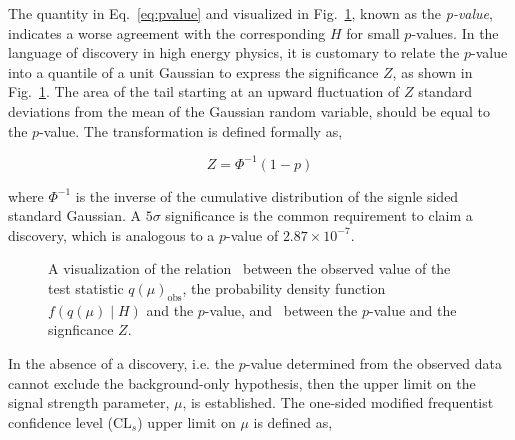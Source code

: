 The quantity in Eq.~\ref{eq:pvalue} and visualized in Fig.~\ref{fig:pvalues}, known as the \textit{p-value}, indicates a worse agreement with the corresponding $H$ for small $p$-values. In the language of discovery in high energy physics, it is customary to relate the $p$-value into a quantile of a unit Gaussian to express the significance $Z$, as shown in Fig.~\ref{fig:pvalues}. The area of the tail starting at an upward fluctuation of $Z$ standard deviations from the mean of the Gaussian random variable, should be equal to the $p$-value. The transformation is defined formally as, 

\begin{equation}
  Z = \Phi^{-1}(1-p)
\end{equation}

where $\Phi^{-1}$ is the inverse of the cumulative distribution of the signle sided standard Gaussian. A $5\sigma$ significance is the common requirement to claim a discovery, which is analogous to a $p$-value of $2.87 \times 10^{-7}$.

\begin{figure}[htbp!]
  \caption{A visualization of the relation~\protect{} between the observed value of the test statistic $q(\mu)_{\textrm{obs}}$, the probability density function $f(q(\mu)\mid H)$ and the $p$-value, and~\protect{} between the $p$-value and the signficance $Z$.}
  \label{fig:pvalues}
\end{figure}

In the absence of a discovery, i.e. the $p$-value determined from the observed data cannot exclude the background-only hypothesis, then the upper limit on the signal strength parameter, $\mu$, is established. The one-sided modified frequentist confidence level ($\textrm{CL}_s$) upper limit on $\mu$ is defined as,

